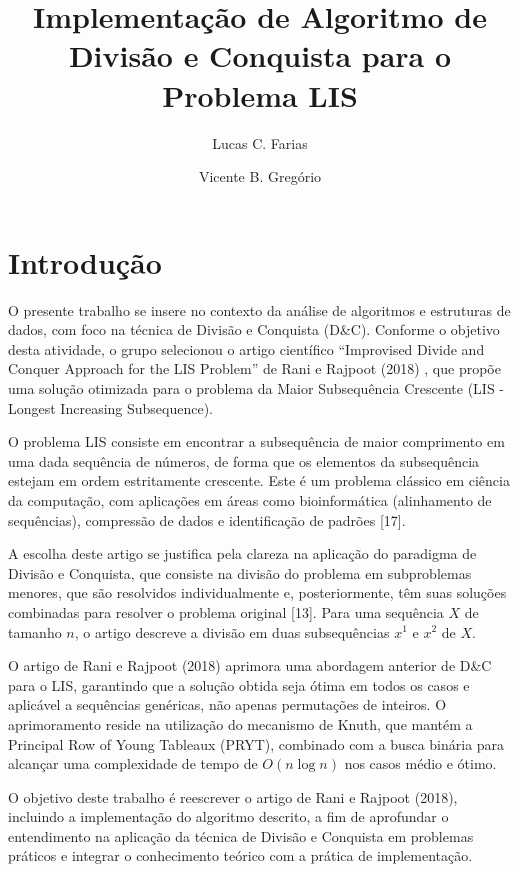\documentclass[por]{ajceam-class}
\title{Implementação de Algoritmo de Divisão e Conquista para o Problema LIS}
\author[1]{Lucas C. Farias}
\author[2]{Vicente B. Gregório}
\affil[1]{Universidade Federal do Tocantins, Palmas, Brasil}
\begin{document}
\maketitle
\thispagestyle{fancy}
\printcontactdata

\section{Introdução} \label{sec:introdution}
O presente trabalho se insere no contexto da análise de algoritmos e estruturas de dados, com foco na técnica de Divisão e Conquista (D\&C). Conforme o objetivo desta atividade, o grupo selecionou o artigo científico ``Improvised Divide and Conquer Approach for the LIS Problem'' de Rani e Rajpoot (2018) \cite{Rani2018}, que propõe uma solução otimizada para o problema da Maior Subsequência Crescente (LIS - Longest Increasing Subsequence).

O problema LIS consiste em encontrar a subsequência de maior comprimento em uma dada sequência de números, de forma que os elementos da subsequência estejam em ordem estritamente crescente. Este é um problema clássico em ciência da computação, com aplicações em áreas como bioinformática (alinhamento de sequências), compressão de dados e identificação de padrões [17].

A escolha deste artigo se justifica pela clareza na aplicação do paradigma de Divisão e Conquista, que consiste na divisão do problema em subproblemas menores, que são resolvidos individualmente e, posteriormente, têm suas soluções combinadas para resolver o problema original [13]. Para uma sequência $X$ de tamanho $n$, o artigo descreve a divisão em duas subsequências $x^1$ e $x^2$ de $X$.

O artigo de Rani e Rajpoot (2018) \cite{Rani2018} aprimora uma abordagem anterior de D\&C para o LIS, garantindo que a solução obtida seja ótima em todos os casos e aplicável a sequências genéricas, não apenas permutações de inteiros. O aprimoramento reside na utilização do mecanismo de Knuth, que mantém a Principal Row of Young Tableaux (PRYT), combinado com a busca binária para alcançar uma complexidade de tempo de $O(n \log n)$ nos casos médio e ótimo.

O objetivo deste trabalho é reescrever o artigo de Rani e Rajpoot (2018), incluindo a implementação do algoritmo descrito, a fim de aprofundar o entendimento na aplicação da técnica de Divisão e Conquista em problemas práticos e integrar o conhecimento teórico com a prática de implementação.
\end{document}
